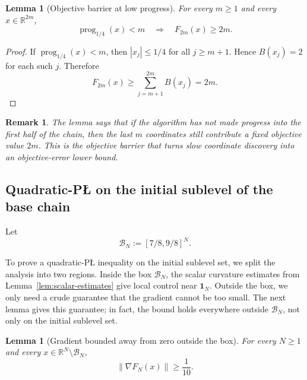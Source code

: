 \documentclass[11pt]{article}
\newtheorem{lemma}[theorem]{Lemma}
\newtheorem{remark}[theorem]{Remark}
\newcommand{\R}{\mathbb{R}}
\newcommand{\norm}[1]{\left\lVert #1\right\rVert}
\newcommand{\prog}{\operatorname{prog}}
\newcommand{\one}{\mathbf{1}}
\begin{document}
\begin{lemma}[Objective barrier at low progress]
\label{lem:objective-barrier}
For every $m\ge 1$ and every $x\in\R^{2m}$,
\[
\prog_{1/4}(x)<m
\quad\Longrightarrow\quad
F_{2m}(x)\ge 2m.
\]
\end{lemma}

\begin{proof}
If $\prog_{1/4}(x)<m$, then $|x_j|\le 1/4$ for all $j\ge m+1$.
Hence $B(x_j)=2$ for each such $j$.
Therefore
\[
F_{2m}(x)\ge \sum_{j=m+1}^{2m}B(x_j)=2m.
\]
\end{proof}

\begin{remark}
The lemma says that if the algorithm has not made progress into the first half of the chain, then the last \(m\)
coordinates still contribute a fixed objective value \(2m\). This is the objective barrier that turns slow coordinate
discovery into an objective-error lower bound.
\end{remark}

\subsection{Quadratic-P\L{} on the initial sublevel of the base chain}
\label{app:sto-quadratic-pl}

Let
\[
\mathcal B_N:=[7/8,9/8]^N.
\]

To prove a quadratic-P\L{} inequality on the initial sublevel set, we split the analysis into two regions. Inside the
box \(\mathcal B_N\), the scalar curvature estimates from Lemma~\ref{lem:scalar-estimates} give local control near
\(\one_N\). Outside the box, we only need a crude guarantee that the gradient cannot be too small. The next lemma gives
this guarantee; in fact, the bound holds everywhere outside \(\mathcal B_N\), not only on the initial sublevel set.

\begin{lemma}[Gradient bounded away from zero outside the box]
\label{lem:outside-box}
For every $N\ge 1$ and every $x\in \R^N\setminus \mathcal B_N$,
\[
\norm{\nabla F_N(x)}\ge \frac{1}{10}.
\]
\end{lemma}
\end{document}
